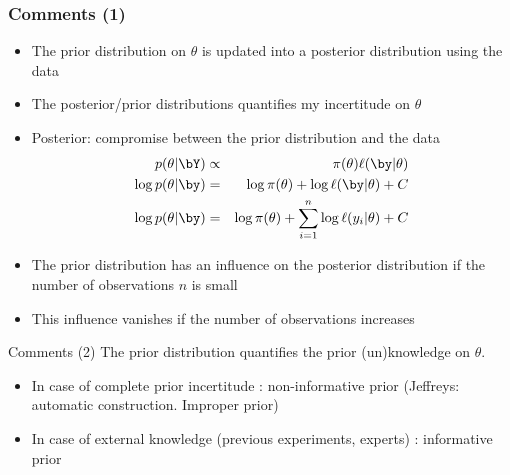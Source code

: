 \begin{frame}\frametitle{Comments (1)}
\begin{itemize}
\item The  prior distribution on $\theta$ is updated  into a posterior distribution using the data
\item The posterior/prior distributions quantifies my incertitude on $\theta$
\item \vert Posterior\noir: compromise between the prior distribution and the data
\begin{eqnarray*}
p(\theta| \bY) &\propto& \pi(\theta) \ell(\by | \theta)\\
\log p(\theta | \by) &=& \log \pi(\theta)  +   \log \ell(\by | \theta) + C\\
\log p(\theta | \by) &=& \log \pi(\theta)  +  \sum_{i=1}^n \log \ell(y_i | \theta) + C
\end{eqnarray*}

\item The prior distribution has an influence on the posterior distribution if the number of observations $n$ is small

\item This influence vanishes if the number of observations increases 

\end{itemize}
\end{frame}
\begin{frame}{Comments (2)}
 The prior distribution quantifies the prior (un)knowledge on $\theta$.
\begin{itemize} 
\item In case of complete prior incertitude : \vert non-informative prior \noir (Jeffreys: automatic construction. Improper prior) 
\item In case of external knowledge (previous experiments, experts) : \vert informative prior  
\end{itemize}
 
\end{frame}

